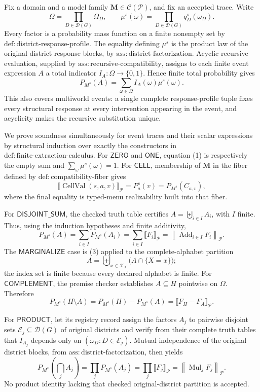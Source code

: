 Fix a domain and a model family \(\mathbf M\in\mathcal C(\mathcal P)\), and fix an accepted trace.  Write
\[
\Omega=\prod_{D\in\mathcal D(G)}\Omega_D,
\qquad
\mu^s(\omega)=\prod_{D\in\mathcal D(G)}q_D^s(\omega_D).
\]
Every factor is a probability mass function on a finite nonempty set by \(\mathrm{def:district\text{-}response\text{-}profile}\).  The equality defining \(\mu^s\) is the product law of the original district response blocks, by \(\mathrm{ass:district\text{-}factorization}\).  Acyclic recursive evaluation, supplied by \(\mathrm{ass:recursive\text{-}compatibility}\), assigns to each finite event expression \(A\) a total indicator \(I_A:\Omega\to\{0,1\}\).  Hence finite total probability gives
\[
P_{M^s}(A)=\sum_{\omega\in\Omega}I_A(\omega)\mu^s(\omega).
\tag{1}
\]
This also covers multiworld events: a single complete response-profile tuple fixes every structural response at every intervention appearing in the event, and acyclicity makes the recursive substitution unique.

We prove soundness simultaneously for event traces and their scalar expressions by structural induction over exactly the constructors in \(\mathrm{def:finite\text{-}extraction\text{-}calculus}\).  For \(\mathsf{ZERO}\) and \(\mathsf{ONE}\), equation (1) is respectively the empty sum and \(\sum_{\omega}\mu^s(\omega)=1\).  For \(\mathsf{CELL}\), membership of \(\mathbf M\) in the fiber defined by \(\mathrm{def:compatibility\text{-}fiber}\) gives
\[
\llbracket\operatorname{CellVal}(s,a,v)\rrbracket_{\mathcal P}
=P_a^s(v)
=P_{M^s}(C_{a,v}),
\tag{2}
\]
where the final equality is typed-menu realizability built into that fiber.

For \(\mathsf{DISJOINT\_SUM}\), the checked truth table certifies \(A=\biguplus_{i\in I}A_i\), with \(I\) finite.  Thus, using the induction hypotheses and finite additivity,
\[
P_{M^s}(A)
=\sum_{i\in I}P_{M^s}(A_i)
=\sum_{i\in I}\llbracket F_i\rrbracket_{\mathcal P}
=\left\llbracket\operatorname{Add}_{i\in I}F_i\right\rrbracket_{\mathcal P}.
\tag{3}
\]
The \(\mathsf{MARGINALIZE}\) case is (3) applied to the complete-alphabet partition
\[
A=\biguplus_{x\in\mathcal X_X}\bigl(A\cap\{X=x\}\bigr);
\tag{4}
\]
the index set is finite because every declared alphabet is finite.  For \(\mathsf{COMPLEMENT}\), the premise checker establishes \(A\subseteq H\) pointwise on \(\Omega\).  Therefore
\[
P_{M^s}(H\setminus A)
=P_{M^s}(H)-P_{M^s}(A)
=\llbracket F_H-F_A\rrbracket_{\mathcal P}.
\tag{5}
\]

For \(\mathsf{PRODUCT}\), let its registry record assign the factors \(A_j\) to pairwise disjoint sets \(\mathcal E_j\subseteq\mathcal D(G)\) of original districts and verify from their complete truth tables that \(I_{A_j}\) depends only on \((\omega_D:D\in\mathcal E_j)\).  Mutual independence of the original district blocks, from \(\mathrm{ass:district\text{-}factorization}\), then yields
\[
P_{M^s}\!\left(\bigcap_j A_j\right)
=\prod_jP_{M^s}(A_j)
=\prod_j\llbracket F_j\rrbracket_{\mathcal P}
=\left\llbracket\operatorname{Mul}_jF_j\right\rrbracket_{\mathcal P}.
\tag{6}
\]
No product identity lacking that checked original-district partition is accepted.

